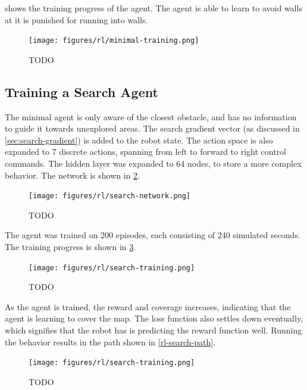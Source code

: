  shows the training progress of the agent. The agent is able to learn to avoid walls at it is punished for running into walls.

\begin{figure}[H]
    \centering
    \texttt{[image: figures/rl/minimal-training.png]}
    \caption{TODO}
    \label{fig:rl-minimal-training}
\end{figure}


\subsection{Training a Search Agent}
The minimal agent is only aware of the closest obstacle, and has no information to guide it towards unexplored areas. The search gradient vector (as discussed in \cref{sec:search-gradient}) is added to the robot state. The action space is also expanded to 7 discrete actions, spanning from left to forward to right control commands. The hidden layer was expanded to 64 nodes, to store a more complex behavior. The network is shown in \cref{fig:rl-search-net}.

\begin{figure}[H]
    \centering
    \texttt{[image: figures/rl/search-network.png]}
    \caption{TODO}
    \label{fig:rl-search-net}
\end{figure}

The agent was trained on 200 episodes, each consisting of 240 simulated seconds. The training progress is shown in \cref{fig:rl-search-training}.

\begin{figure}[H]
    \centering
    \texttt{[image: figures/rl/search-training.png]}
    \caption{TODO}
    \label{fig:rl-search-training}
\end{figure}

As the agent is trained, the reward and coverage increases, indicating that the agent is learning to cover the map. The loss function also settles down eventually, which signifies that the robot has is predicting the reward function well. Running the behavior results in the path shown in \cref{rl-search-path}.

\begin{figure}[H]
    \centering
    \texttt{[image: figures/rl/search-training.png]}
    \caption{TODO}
    \label{fig:rl-search-path}
\end{figure}

